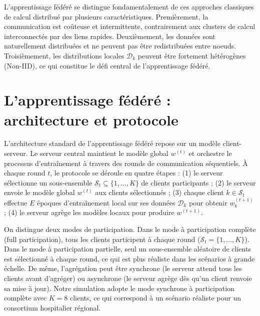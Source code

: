 \documentclass[12pt,a4paper]{report}
\begin{document}
L'apprentissage f\'{e}d\'{e}r\'{e} se distingue fondamentalement de ces approches classiques de calcul distribu\'{e} par plusieurs caract\'{e}ristiques. Premi\`{e}rement, la communication est co\^{u}teuse et intermittente, contrairement aux clusters de calcul interconnect\'{e}s par des liens rapides. Deuxi\`{e}mement, les donn\'{e}es sont naturellement distribu\'{e}es et ne peuvent pas \^{e}tre redistribu\'{e}es entre noeuds. Troisi\`{e}mement, les distributions locales $\mathcal{D}_k$ peuvent \^{e}tre fortement h\'{e}t\'{e}rog\`{e}nes (Non-IID), ce qui constitue le d\'{e}fi central de l'apprentissage f\'{e}d\'{e}r\'{e}.

\section{L'apprentissage f\'{e}d\'{e}r\'{e} : architecture et protocole}

L'architecture standard de l'apprentissage f\'{e}d\'{e}r\'{e} repose sur un mod\`{e}le client-serveur. Le serveur central maintient le mod\`{e}le global $w^{(t)}$ et orchestre le processus d'entra\^{i}nement \`{a} travers des rounds de communication s\'{e}quentiels. \`{A} chaque round $t$, le protocole se d\'{e}roule en quatre \'{e}tapes : (1) le serveur s\'{e}lectionne un sous-ensemble $\mathcal{S}_t \subseteq \{1, \ldots, K\}$ de clients participants ; (2) le serveur envoie le mod\`{e}le global $w^{(t)}$ aux clients s\'{e}lectionn\'{e}s ; (3) chaque client $k \in \mathcal{S}_t$ effectue $E$ \'{e}poques d'entra\^{i}nement local sur ses donn\'{e}es $\mathcal{D}_k$ pour obtenir $w_k^{(t+1)}$ ; (4) le serveur agr\`{e}ge les mod\`{e}les locaux pour produire $w^{(t+1)}$.

On distingue deux modes de participation. Dans le mode \`{a} participation compl\`{e}te (full participation), tous les clients participent \`{a} chaque round ($\mathcal{S}_t = \{1, \ldots, K\}$). Dans le mode \`{a} participation partielle, seul un sous-ensemble al\'{e}atoire de clients est s\'{e}lectionn\'{e} \`{a} chaque round, ce qui est plus r\'{e}aliste dans les sc\'{e}narios \`{a} grande \'{e}chelle. De m\^{e}me, l'agr\'{e}gation peut \^{e}tre synchrone (le serveur attend tous les clients avant d'agr\'{e}ger) ou asynchrone (le serveur agr\`{e}ge d\`{e}s qu'un client renvoie sa mise \`{a} jour). Notre simulation adopte le mode synchrone \`{a} participation compl\`{e}te avec $K = 8$ clients, ce qui correspond \`{a} un sc\'{e}nario r\'{e}aliste pour un consortium hospitalier r\'{e}gional.
\end{document}
